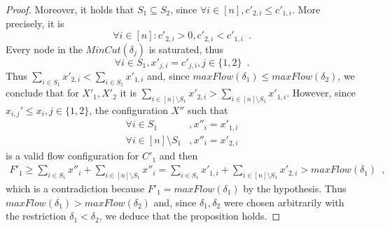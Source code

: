 \begin{proof}
  Moreover, it holds that $S_1 \subseteq S_2$, since $\forall i \in [n], c'_{2, i} \leq c'_{1, i}$. More precisely, it is
  \begin{equation*}
    \forall i \in [n] : c'_{2, i} > 0, c'_{2, i} < c'_{1, i} \enspace.
  \end{equation*}
  Every node in the $MinCut\left(\delta_j\right)$ is saturated, thus
  \begin{equation*}
    \forall i \in S_1, x'_{j, i} = c'_{j, i}, j \in \{1, 2\} \enspace.
  \end{equation*}
  Thus $\sum\limits_{i \in S_1} x'_{2, i} < \sum\limits_{i \in S_1}x'_{1, i}$ and, since $maxFlow(\delta_1) \leq
  maxFlow(\delta_2)$, we conclude that for $X'_1, X'_2$ it is $\sum\limits_{i \in [n] \setminus S_1}x'_{2, i} >
  \sum\limits_{i \in [n] \setminus S_1}x'_{1, i}$. However, since $x_{i,j}' \leq x_i, j \in \{1,2\}$, the configuration $X''$
  such that
  \begin{align*}
    \forall i \in S_1&, x''_i = x'_{1, i} \\
    \forall i \in [n] \setminus S_1&, x''_i = x'_{2, i}
  \end{align*}
  is a valid flow configuration for $C'_1$ and then
  \begin{equation*}
  \begin{gathered}
    F'_1 \geq \sum\limits_{i \in S_1}x''_i + \sum\limits_{i \in [n] \setminus S_1}x''_i = \sum\limits_{i \in S_1}x'_{1, i} +
    \sum\limits_{i \in [n] \setminus S_1}x'_{2, i} > maxFlow\left(\delta_1\right)
    \enspace,
  \end{gathered}
  \end{equation*}
  which is a contradiction because $F'_1 = maxFlow\left(\delta_1\right)$ by the hypothesis. Thus
  $maxFlow\left(\delta_1\right) > maxFlow\left(\delta_2\right)$ and, since $\delta_1, \delta_2$ were chosen arbitrarily with
  the restriction $\delta_1 < \delta_2$, we deduce that the proposition holds.
\end{proof}
